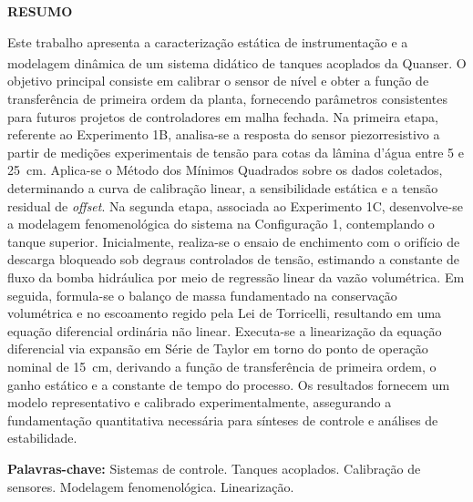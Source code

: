 \documentclass[a4paper,12pt]{article}
\begin{document}
\newpage


\thispagestyle{empty}

\begin{center}
{\large \textbf{RESUMO}}
\end{center}

\vspace{3cm}

\vspace{\baselineskip}

\begin{justify}
\noindent Este trabalho apresenta a caracterização estática de instrumentação e a modelagem dinâmica de um sistema didático de tanques acoplados da Quanser\textsuperscript{\textregistered}. O objetivo principal consiste em calibrar o sensor de nível e obter a função de transferência de primeira ordem da planta, fornecendo parâmetros consistentes para futuros projetos de controladores em malha fechada. Na primeira etapa, referente ao Experimento 1B, analisa-se a resposta do sensor piezorresistivo a partir de medições experimentais de tensão para cotas da lâmina d'água entre 5 e 25~cm. Aplica-se o Método dos Mínimos Quadrados sobre os dados coletados, determinando a curva de calibração linear, a sensibilidade estática e a tensão residual de \textit{offset}. Na segunda etapa, associada ao Experimento 1C, desenvolve-se a modelagem fenomenológica do sistema na Configuração 1, contemplando o tanque superior. Inicialmente, realiza-se o ensaio de enchimento com o orifício de descarga bloqueado sob degraus controlados de tensão, estimando a constante de fluxo da bomba hidráulica por meio de regressão linear da vazão volumétrica. Em seguida, formula-se o balanço de massa fundamentado na conservação volumétrica e no escoamento regido pela Lei de Torricelli, resultando em uma equação diferencial ordinária não linear. Executa-se a linearização da equação diferencial via expansão em Série de Taylor em torno do ponto de operação nominal de 15~cm, derivando a função de transferência de primeira ordem, o ganho estático e a constante de tempo do processo. Os resultados fornecem um modelo representativo e calibrado experimentalmente, assegurando a fundamentação quantitativa necessária para sínteses de controle e análises de estabilidade.
\end{justify}

\vspace{\baselineskip}

\noindent\textbf{Palavras-chave:} Sistemas de controle. Tanques acoplados. Calibração de sensores. Modelagem fenomenológica. Linearização.
\end{document}
